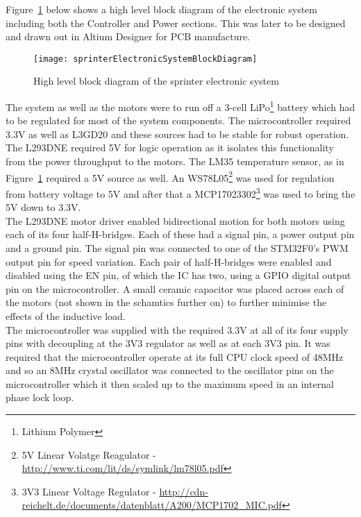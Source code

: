     Figure~\ref{fig:sprinterElectronicSystemBlockDiagram} below shows a high level block diagram of the electronic system including both the Controller and Power sections.  This was later to be designed and drawn out in Altium Designer for PCB manufacture.

    \begin{figure}[H]
      \begin{center}
        \texttt{[image: sprinterElectronicSystemBlockDiagram]}
        \caption{High level block diagram of the sprinter electronic system}
        \label{fig:sprinterElectronicSystemBlockDiagram}
      \end{center}
    \end{figure}

    The system as well as the motors were to run off a 3-cell LiPo\footnote{Lithium Polymer} battery which had to be regulated for most of the system components. The microcontroller required 3.3V as well as L3GD20 and these sources had to be stable for robust operation. The L293DNE required 5V for logic operation as it isolates this functionality from the power throughput to the motors. The LM35 temperature sensor, as in Figure~\ref{fig:sprinterElectronicSystemBlockDiagram} required a 5V source as well. An WS78L05\footnote{5V Linear Volatge Reagulator - \url{http://www.ti.com/lit/ds/symlink/lm78l05.pdf}} was used for regulation from battery voltage to 5V and after that a MCP17023302\footnote{3V3 Linear Voltage Regulator - \url{http://cdn-reichelt.de/documents/datenblatt/A200/MCP1702_MIC.pdf}} was used to bring the 5V down to 3.3V.\\

    The L293DNE motor driver enabled bidirectional motion for both motors using each of its four half-H-bridges. Each of these had a signal pin, a power output pin and a ground pin. The signal pin was connected to one of the STM32F0's PWM output pin for speed variation. Each pair of half-H-bridges were enabled and disabled using the EN pin, of which the IC has two, using a GPIO digital output pin on the microcontroller. A small ceramic capacitor was placed across each of the motors (not shown in the schamtics further on) to further minimise the effects of the inductive load.\\

    The microcontroller was supplied with the required 3.3V at all of its four supply pins with decoupling at the 3V3 regulator as well as at each 3V3 pin. It was required that the microcontroller operate at its full CPU clock speed of 48MHz and so an 8MHz crystal oscillator was connected to the oscillator pins on the microcontroller which it then scaled up to the maximum speed in an internal phase lock loop.\\

